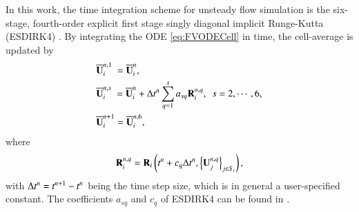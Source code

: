 In this work, the time integration scheme for unsteady flow simulation is the six-stage, fourth-order explicit first stage singly diagonal implicit Runge-Kutta (ESDIRK4) \cite{bijl2002implicitBDFvESDIRK}. By integrating the ODE \eqref{eq:FVODECell} in time, the cell-average is updated by
\begin{subequations}\label{eq:ESDIRK4}
    \begin{align}
         & \overline{\mathbf{U}}^{n,1}_i \ = \overline{\mathbf{U}}^{n}_i, \label{eq:esdirk4-1}                                                                  \\
         & \overline{\mathbf{U}}^{n,s}_i \ = \overline{\mathbf{U}}^{n}_i + \mathrm\Delta t^n \sum_{q=1}^{s} a_{sq} \mathbf{R}_i^{n,q},\ \ s = 2, \cdots, 6, \label{eq:esdirk4-s} \\
         & \overline{\mathbf{U}}^{n+1}_i = \overline{\mathbf{U}}^{n,6}_i, \label{eq:esdirk4-6}
    \end{align}
\end{subequations}
where
\begin{equation}
    \mathbf{R}^{n,q}_i  = \mathbf{R}_i \left(t^n + c_q \mathrm\Delta t^n, \left\{\mathbf{U}^{n,q}_j\right\}_{j \in S_i}\right),
\end{equation}
with $\mathrm\Delta t^n= t^{n+1} - t^n$ being the time step size, which is in general a user-specified constant.
The coefficients $a_{sq}$ and $c_q$ of ESDIRK4 can be found
in \cite{bijl2002implicitBDFvESDIRK}.

